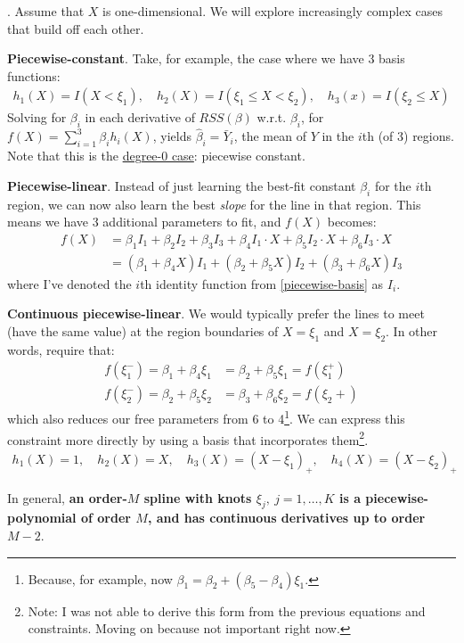 \documentclass[12pt]{article}
\newcommand{\myspace}{\vspace{2\bigskipamount}}
\newcommand\p{\Needspace{10\baselineskip} \noindent}
\begin{document}
\myspace
\p {}. Assume that $X$ is one-dimensional. We will explore increasingly complex cases that build off each other.
\begin{compactitem}
	\item \textbf{Piecewise-constant}. Take, for example, the case where we have 3 basis functions:
	\begin{align}
		h_1(X) = I(X < \xi_1), \quad h_2(X) = I(\xi_1 \le X < \xi_2), \quad h_3(x) = I(\xi_2 \le X) \label{piecewise-basis}
	\end{align}
	Solving for $\beta_i$ in each derivative of $RSS(\beta)$ w.r.t. $\beta_i$, for $f(X) = \sum_{i = 1}^{3} \beta_i h_i(X)$, yields $\hat \beta_i = \bar Y_i$, the mean of $Y$ in the $i$th (of 3) regions. Note that this is the \underline{degree-0 case}: piecewise constant. \\
	
	\item \textbf{Piecewise-linear}. Instead of just learning the best-fit constant $\beta_i$ for the $i$th region, we can now also learn the best \textit{slope} for the line in that region. This means we have 3 additional parameters to fit, and $f(X)$ becomes:
	\begin{align}
		f(X) &= \beta_1 I_1 + \beta_2 I_2 + \beta_3 I_3 + \beta_4 I_1 \cdot X + \beta_5 I_2 \cdot X + \beta_6 I_3 \cdot X \\
		&= (\beta_1 + \beta_4 X) I_1 + (\beta_2 + \beta_5 X) I_2 + (\beta_3 + \beta_6 X) I_3
	\end{align}
	where I've denoted the $i$th identity function from \ref{piecewise-basis} as $I_i$. 
	
	\item \textbf{Continuous piecewise-linear}. We would typically prefer the lines to meet (have the same value) at the region boundaries of $X = \xi_1$ and $X = \xi_2$. In other words, require that:
	\begin{align}
		f(\xi_1^-) = \beta_1 + \beta_4 \xi_1 &= \beta_2 + \beta_5 \xi_1 = f(\xi_1^+) \\
		f(\xi_2^-) = \beta_2 + \beta_5\xi_2 &= \beta_3 + \beta_6 \xi_2 = f(\xi_2+)
	\end{align}
	which also reduces our free parameters from 6 to 4\footnote{Because, for example, now $\beta_1 = \beta_2 + (\beta_5 - \beta_4) \xi_1$.}. We can express this constraint more directly by using a basis that incorporates them\footnote{Note: I was not able to derive this form from the previous equations and constraints. Moving on because not important right now.}. 
	\begin{align}
		h_1(X) = 1, \quad h_2(X) = X, \quad h_3(X) = (X - \xi_1)_+, \quad h_4(X) = (X - \xi_2)_+
	\end{align}                                               
\end{compactitem}
In general, \textbf{an order-$M$ spline with knots $\xi_j, ~ j = 1,\ldots,K$ is a piecewise-polynomial of order $M$, and has continuous derivatives up to order $M-2$}. 
\end{document}
